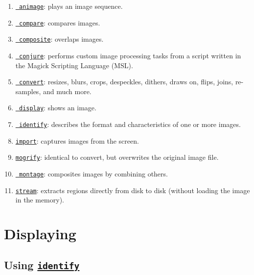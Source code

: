 \begin{enumerate}
\item \href{http://www.imagemagick.org/script/animate.php}{\tt
    animage}: plays an image sequence.
\item \href{http://www.imagemagick.org/script/compare.php}{\tt
    compare}: compares images.
\item \href{http://www.imagemagick.org/script/composite.php}{\tt
    composite}: overlaps images.
\item \href{http://www.imagemagick.org/script/conjure.php}{\tt
    conjure}: performs custom image processing tasks from a script
  written in the Magick Scripting Language (MSL).
\item \href{http://www.imagemagick.org/script/convert.php}{\tt
    convert}: resizes, blurs, crops, despeckles, dithers, draws on,
  flips, joins, re-samples, and much more.
\item \href{http://www.imagemagick.org/script/display.php}{\tt
    display}: shows an image.
\item \href{http://www.imagemagick.org/script/identify.php}{\tt
    identify}: describes the format and characteristics of one or more
  images.
\item \href{http://www.imagemagick.org/script/import.php}{\tt import}:
  captures images from the screen.
\item \href{http://www.imagemagick.org/script/mogrify.php}{\tt mogrify}:
  identical to convert, but overwrites the original image file.
\item \href{http://www.imagemagick.org/script/montage.php}{\tt
    montage}: composites images by combining others.
\item \href{http://www.imagemagick.org/script/stream.php}{\tt stream}:
  extracts regions directly from disk to disk (without loading the
  image in the memory).
\end{enumerate}



\chapter{Displaying}

\section{Using \href{http://www.imagemagick.org/script/identify.php}{\texttt{identify}}}


